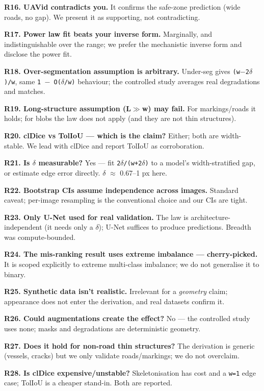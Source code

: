 \documentclass[11pt]{article}
\begin{document}
\textbf{R16. UAVid contradicts you.} It confirms the safe-zone prediction (wide roads, no gap). We present it as supporting, not contradicting.

\textbf{R17. Power law fit beats your inverse form.} Marginally, and indistinguishable over the range; we prefer the mechanistic inverse form and disclose the power fit.

\textbf{R18. Over-segmentation assumption is arbitrary.} Under-seg gives \texttt{(w$-$2$\delta$)/w}, same \texttt{1 $-$ O($\delta$/w)} behaviour; the controlled study averages real degradations and matches.

\textbf{R19. Long-structure assumption (L$\gg$w) may fail.} For markings/roads it holds; for blobs the law does not apply (and they are not thin structures).

\textbf{R20. clDice vs TolIoU --- which is the claim?} Either; both are width-stable. We lead with clDice and report TolIoU as corroboration.

\textbf{R21. Is $\delta$ measurable?} Yes --- fit \texttt{2$\delta$/(w+2$\delta$)} to a model's width-stratified gap, or estimate edge error directly. $\delta$ $\approx$ 0.67--1 px here.

\textbf{R22. Bootstrap CIs assume independence across images.} Standard caveat; per-image resampling is the conventional choice and our CIs are tight.

\textbf{R23. Only U-Net used for real validation.} The law is architecture-independent (it needs only a $\delta$); U-Net suffices to produce predictions. Breadth was compute-bounded.

\textbf{R24. The mis-ranking result uses extreme imbalance --- cherry-picked.} It is scoped explicitly to extreme multi-class imbalance; we do not generalise it to binary.

\textbf{R25. Synthetic data isn't realistic.} Irrelevant for a \textit{geometry} claim; appearance does not enter the derivation, and real datasets confirm it.

\textbf{R26. Could augmentations create the effect?} No --- the controlled study uses none; masks and degradations are deterministic geometry.

\textbf{R27. Does it hold for non-road thin structures?} The derivation is generic (vessels, cracks) but we only validate roads/markings; we do not overclaim.

\textbf{R28. Is clDice expensive/unstable?} Skeletonisation has cost and a \texttt{w=1} edge case; TolIoU is a cheaper stand-in. Both are reported.
\end{document}
